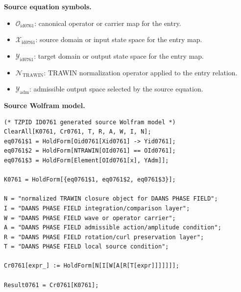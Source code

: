 \begin{minipage}[t]{0.49\linewidth}
\begingroup
\small
\raggedright
\textbf{Source equation symbols.}\par
\begin{itemize}[leftmargin=1.35em,itemsep=1pt,topsep=1pt,parsep=0pt]
    \item $\mathcal{O}_{\mathrm{id0761}}$: canonical operator or carrier map for the entry.
    \item $\mathcal{X}_{\mathrm{id0761}}$: source domain or input state space for the entry map.
    \item $\mathcal{Y}_{\mathrm{id0761}}$: target domain or output state space for the entry map.
    \item $\mathcal{N}_{\mathrm{TRAWIN}}$: TRAWIN normalization operator applied to the entry relation.
    \item $\mathcal{Y}_{\mathrm{adm}}$: admissible output space selected by the source equation.
\end{itemize}
\endgroup
\end{minipage}\hfill
\begin{minipage}[t]{0.47\linewidth}
\begingroup
\scriptsize
\raggedright
\textbf{Source Wolfram model.}\par
\begin{Verbatim}[fontsize=\tiny,breaklines=true,breakanywhere=true]
(* TZPID ID0761 generated source Wolfram model *)
ClearAll[K0761, Cr0761, T, R, A, W, I, N];
eq0761$1 = HoldForm[Oid0761[Xid0761] -> Yid0761];
eq0761$2 = HoldForm[NTRAWIN[OId0761] == OId0761];
eq0761$3 = HoldForm[Element[OId0761[x], YAdm]];

K0761 = HoldForm[{eq0761$1, eq0761$2, eq0761$3}];

N = "normalized TRAWIN closure object for DAANS PHASE FIELD";
I = "DAANS PHASE FIELD integration/comparison layer";
W = "DAANS PHASE FIELD wave or operator carrier";
A = "DAANS PHASE FIELD admissible action/amplitude condition";
R = "DAANS PHASE FIELD rotation/curl preservation layer";
T = "DAANS PHASE FIELD local source condition";

Cr0761[expr_] := HoldForm[N[I[W[A[R[T[expr]]]]]]];

Result0761 = Cr0761[K0761];
\end{Verbatim}
\endgroup
\end{minipage}

